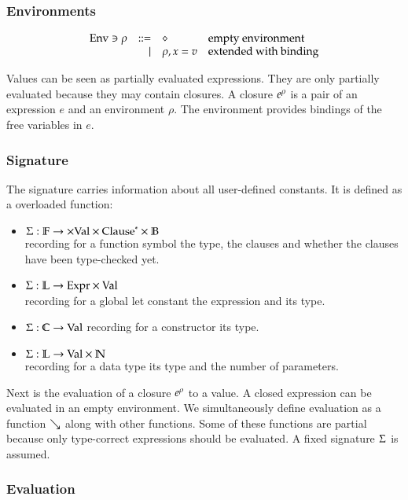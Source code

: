 \subsubsection{Environments}
\[
\begin{array}{lrll}
\mathrm{Env} \ni \rho & ::= & \diamond & \mbox{empty environment}\\
& \mid & \rho,x = v & \mbox{extended with binding}\\
\end{array}
\]

Values can be seen as partially evaluated expressions.
They are only partially evaluated because they may contain closures.
A closure $e^{\rho}$ is a pair of an expression $e$ and an environment $\rho$.
The environment provides bindings of the free variables in $e$.
\subsubsection{Signature}
The signature carries information about all user-defined constants.
It is defined as a overloaded function:
\begin{itemize}
\item
$ \mathrm{\Sigma} : \mathbb{F} \rightarrow \times \mathrm{Val} \times {\mathrm{Clause}}^{\ast} \times \mathbb{B} $\\
recording for a function symbol the type, the clauses and whether the clauses have been type-checked yet.
\item
$ \mathrm{\Sigma} : \mathbb{L} \rightarrow \mathrm{Expr} \times \mathrm{Val} $ \\
recording for a global let constant the expression and its type. 
\item
$ \mathrm{\Sigma} : \mathbb{C} \rightarrow \mathrm{Val} $
recording for a constructor its type.
\item
$ \mathrm{\Sigma} : \mathbb{L} \rightarrow \mathrm{Val} \times \mathbb{N} $\\
recording for a data type its type and the number of parameters.
\end{itemize}

Next is the evaluation of a closure $e^{\rho}$ to a value. 
A closed expression can be evaluated in an empty environment.
We simultaneously define evaluation as a function $\searrow$ along with other functions.    
Some of these functions are partial because only type-correct expressions should be evaluated.
A fixed signature $\mathrm{\Sigma}$ is assumed.

\subsubsection{Evaluation}


